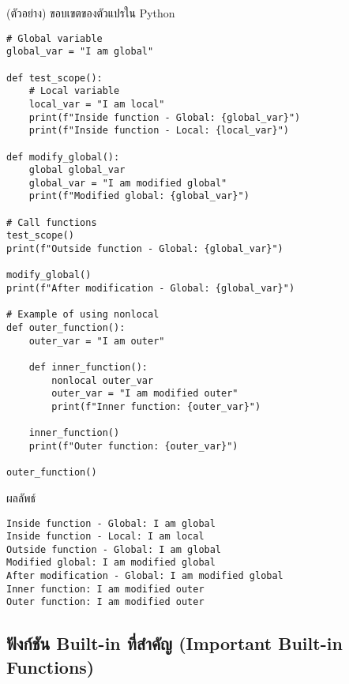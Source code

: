 \documentclass[12pt,a4paper]{article}
\newcommand{\textlight}[1]{{\thailightfont #1}}
\begin{document}
\begin{codebox}{(ตัวอย่าง) ขอบเขตของตัวแปรใน Python}
\begin{lstlisting}[style=python]
# Global variable
global_var = "I am global"

def test_scope():
    # Local variable
    local_var = "I am local"
    print(f"Inside function - Global: {global_var}")
    print(f"Inside function - Local: {local_var}")

def modify_global():
    global global_var
    global_var = "I am modified global"
    print(f"Modified global: {global_var}")

# Call functions
test_scope()
print(f"Outside function - Global: {global_var}")

modify_global()
print(f"After modification - Global: {global_var}")

# Example of using nonlocal
def outer_function():
    outer_var = "I am outer"
    
    def inner_function():
        nonlocal outer_var
        outer_var = "I am modified outer"
        print(f"Inner function: {outer_var}")
    
    inner_function()
    print(f"Outer function: {outer_var}")

outer_function()
\end{lstlisting}
\end{codebox}

\begin{resultbox}{ผลลัพธ์}
\begin{verbatim}
Inside function - Global: I am global
Inside function - Local: I am local
Outside function - Global: I am global
Modified global: I am modified global
After modification - Global: I am modified global
Inner function: I am modified outer
Outer function: I am modified outer
\end{verbatim}
\end{resultbox}

\subsection{ฟังก์ชัน Built-in ที่สำคัญ (Important Built-in Functions)}

\hspace{1cm}\textlight{Python มีฟังก์ชัน Built-in จำนวนมากที่พร้อมใช้งานทันทีโดยไม่ต้อง import เพิ่มเติม ฟังก์ชันเหล่านี้ช่วยให้นักศึกษาสามารถเขียนโปรแกรมได้อย่างมีประสิทธิภาพมากขึ้น เช่น การแปลงข้อมูล การกรองข้อมูล หรือการคำนวณค่าสถิติพื้นฐาน ซึ่งเป็นทักษะที่จำเป็นในการพัฒนาโปรแกรม}
\end{document}
